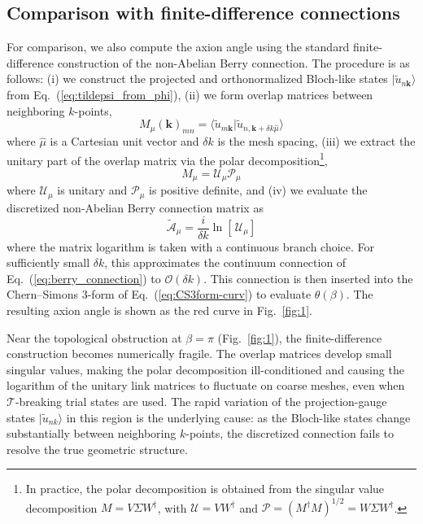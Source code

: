 \documentclass[galley,aps,pra,10pt,amsmath,amssymb,
    superscriptaddress,nofootinbib,longbibliography]{revtex4-2}
\newcounter{comm}
\newcommand{\eq}[1]{Eq.~(\ref{eq:#1})}
\newcommand{\ket}[1]{\vert#1\rangle}
\begin{document}
\subsection{Comparison with finite-difference connections}

For comparison, we also compute the axion angle using the standard finite-difference construction of the non-Abelian Berry connection. The procedure is as follows:
(i) we construct the projected and orthonormalized Bloch-like states $\ket{\tilde{u}_{n\mathbf{k}}}$ from \eq{tildepsi_from_phi},
(ii) we form overlap matrices between neighboring $k$-points,
\begin{equation}
    M_\mu(\mathbf{k})_{mn} = \langle \tilde{u}_{m\mathbf{k}}|\tilde{u}_{n,\mathbf{k } + \delta k \hat{\mu}}\rangle
\end{equation}
where $\hat{\mu}$ is a Cartesian unit vector and $\delta k$ is the mesh spacing, (iii) we extract the unitary part of the overlap matrix via the polar decomposition\footnote{In practice, the polar decomposition is obtained from the singular value decomposition $M=V\Sigma W^\dagger$, with $\mathcal U = V W^\dagger$ and $\mathcal{P} =(M^\dagger M)^{1/2} = W\Sigma W^\dagger$.},
\begin{equation}
        M_{\mu} = \mathcal{U}_{\mu}\mathcal{P}_\mu
\end{equation}
where $\mathcal U_\mu$ is unitary and $\mathcal P_\mu$ is positive definite,
and (iv) we evaluate the discretized non-Abelian Berry connection matrix as
\begin{equation}
\label{eq:fd_connection}
    \tilde{\mathcal{A}}_\mu = \frac{i}{\delta k} \ln\left[\,\mathcal{U}_\mu \right]
\end{equation}
where the matrix logarithm is taken with a continuous branch choice. For sufficiently small $\delta k$, this approximates the continuum connection of \eq{berry_connection} to $\mathcal{O}(\delta k)$. This connection is then inserted into the Chern--Simons 3-form of \eq{CS3form-curv} to evaluate $\theta(\beta)$. The resulting axion angle is shown as the red curve in Fig.~\ref{fig:1}. 

Near the topological obstruction at $\beta=\pi$ (Fig.~\ref{fig:1}), the finite-difference construction becomes numerically fragile. The overlap matrices develop small singular values, making the polar decomposition ill-conditioned and causing the logarithm of the unitary link matrices to fluctuate on coarse meshes, even when $\mathcal{T}$-breaking trial states are used. The rapid variation of the projection-gauge states $|\tilde{u}_{nk}\rangle$ in this region is the underlying cause: as the Bloch-like states change substantially between neighboring $k$-points, the discretized connection fails to resolve the true geometric structure.
\end{document}
